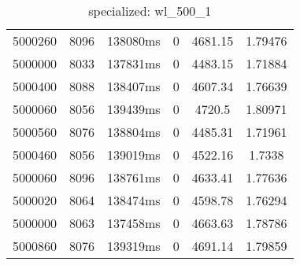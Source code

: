 \documentclass[./main.tex]{subfiles}
\begin{document}
\begin{table}
\begin{tabular}{ c | c | c | c | c | c }
        5000260 & 8096 & 138080ms & 0 & 4681.15 & 1.79476 \\
        5000000 & 8033 & 137831ms & 0 & 4483.15 & 1.71884 \\
        \rowcolor{lightgray} 5000400 & 8088 & 138407ms & 0 & 4607.34 & 1.76639 \\
        5000060 & 8056 & 139439ms & 0 & 4720.5 & 1.80971 \\
        5000560 & 8076 & 138804ms & 0 & 4485.31 & 1.71961 \\
        5000460 & 8056 & 139019ms & 0 & 4522.16 & 1.7338 \\
        5000060 & 8096 & 138761ms & 0 & 4633.41 & 1.77636 \\
        5000020 & 8064 & 138474ms & 0 & 4598.78 & 1.76294 \\
        5000000 & 8063 & 137458ms & 0 & 4663.63 & 1.78786 \\
        5000860 & 8076 & 139319ms & 0 & 4691.14 & 1.79859 \\
    \end{tabular}
    \caption{specialized: wl\_500\_1}
\end{table}
\end{document}
